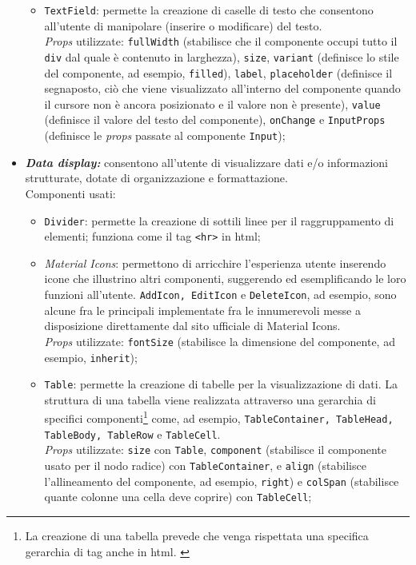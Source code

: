 \begin{itemize}
\begin{itemize}
      \item \texttt{TextField}: permette la creazione di caselle di testo che consentono all'utente di manipolare (inserire o modificare) del testo.\\ 
      \textit{Props} utilizzate: \texttt{fullWidth} (stabilisce che il componente occupi tutto il \texttt{div} dal quale è contenuto in larghezza), \texttt{size}, \texttt{variant} (definisce lo stile del componente, ad esempio, \texttt{filled}), \texttt{label}, \texttt{placeholder} (definisce il segnaposto, ciò che viene visualizzato all'interno del componente quando il cursore non è ancora posizionato e il valore non è presente), \texttt{value} (definisce il valore del testo del componente), \texttt{onChange} e \texttt{InputProps} (definisce le \textit{props} passate al componente \texttt{Input});
    \end{itemize}

  \item \textbf{\textit{Data display:}} consentono all'utente di visualizzare dati e/o informazioni strutturate, dotate di organizzazione e formattazione.\\
  Componenti usati:
    \begin{itemize}
      \item \texttt{Divider}: permette la creazione di sottili linee per il raggruppamento di elementi; funziona come il tag \texttt{<hr>} in \gls{html};
      
      \item \textit{Material Icons}: permettono di arricchire l'esperienza utente inserendo icone che illustrino altri componenti, suggerendo ed esemplificando le loro funzioni all'utente. \texttt{AddIcon, EditIcon} e \texttt{DeleteIcon}, ad esempio, sono alcune fra le principali implementate fra le innumerevoli messe a disposizione direttamente dal sito ufficiale di Material Icons.\\
      \textit{Props} utilizzate: \texttt{fontSize} (stabilisce la dimensione del componente, ad esempio, \texttt{inherit});

      \item \texttt{Table}: permette la creazione di tabelle per la visualizzazione di dati. La struttura di una tabella viene realizzata attraverso una gerarchia di specifici componenti\footnote{La creazione di una tabella prevede che venga rispettata una specifica gerarchia di tag anche in \gls{html}. \label{strutturaGerarchicaHTML}} come, ad esempio, \texttt{TableContainer, TableHead, TableBody, TableRow} e \texttt{TableCell}.\\
      \textit{Props} utilizzate: \texttt{size} con \texttt{Table}, \texttt{component} (stabilisce il componente usato per il nodo radice) con \texttt{TableContainer}, e \texttt{align} (stabilisce l'allineamento del componente, ad esempio, \texttt{right}) e \texttt{colSpan} (stabilisce quante colonne una cella deve coprire) con \texttt{TableCell};
      

\end{itemize}
\end{itemize}
